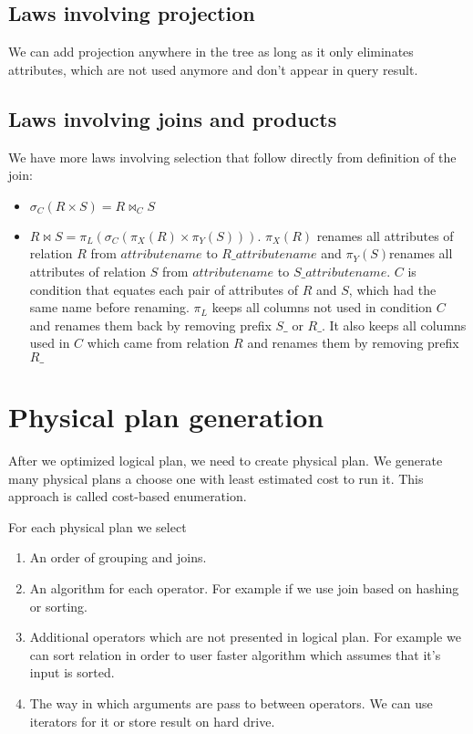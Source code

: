 \subsection{Laws involving projection}
We can add projection anywhere in the tree as long as it only eliminates attributes, which are not used anymore and don't appear in query result.
\subsection{Laws involving joins and products}

We have more laws involving selection that follow directly from definition of the join:
\begin{itemize}
\item $\sigma_{C}(R \times S)=R \Join_{C} S$
\item $R \Join S=\pi_L(\sigma_{C}(\pi_X(R) \times \pi_Y(S)))$. $\pi_X(R)$ renames all attributes of relation $R$ from $attributename$ to $R\_attributename$ and $\pi_Y(S)$renames all attributes of relation $S$ from $attributename$ to $S\_attributename$. $C$ is condition that equates each pair of attributes of $R$ and $S$, which had the same name before renaming. $\pi_L$ keeps all columns not used in condition $C$ and renames them back by removing prefix $S\_$ or $R\_$. It also keeps all columns used in $C$ which came from relation $R$ and renames them by removing prefix $R\_$
\end{itemize}



\section{Physical plan generation}

After we optimized logical plan, we need to create physical plan. We generate many physical plans a choose one with least estimated cost to run it. This approach is called cost-based enumeration.

For each physical plan we select 
\begin{enumerate}
\item An order of grouping and joins.
\item An algorithm for each operator. For example if we use join based on hashing or sorting.
\item Additional operators which are not presented in logical plan. For example we can sort relation in order to user faster algorithm which assumes that it's input is sorted.
\item The way in which arguments are pass to between operators. We can use iterators for it or store result on hard drive.
\end{enumerate}

